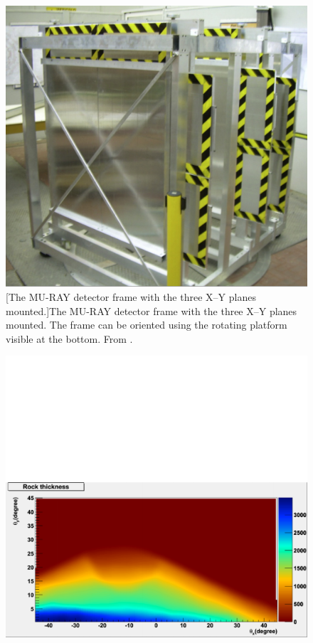 \begin{figure}[!h]
\centering
\begin{minipage}{.45\textwidth}
  \centering
  \includegraphics[width=\linewidth]{Chapter6/Figs/Raster/muRayDetectorsAdj.png}
  [The MU-RAY detector frame with the three X–Y planes mounted.]{The MU-RAY detector frame with the three X–Y planes mounted. The frame can be oriented using the rotating platform visible at the bottom. From \cite{ANASTASIO2013423}.} 
  \label{fig:muRayDetectors}
  \vspace{0.478cm} %
\end{minipage}%
\qquad
\begin{minipage}{.45\textwidth}
  \centering
  \includegraphics[width=\linewidth]{Chapter6/Figs/Raster/mtVesuviusMuRayImagingAdj.png}

\end{minipage}
\end{figure}
